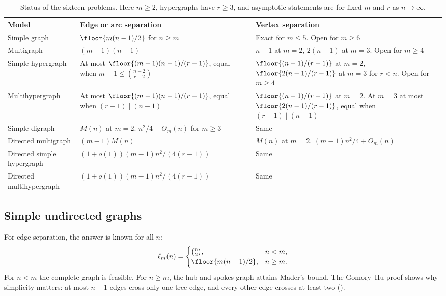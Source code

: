 \begin{table}[htbp]
\centering\small
\renewcommand{\arraystretch}{1.2}
\begin{tabularx}{\textwidth}{@{}>{\raggedright\arraybackslash}p{}>{\raggedright\arraybackslash}X>{\raggedright\arraybackslash}X@{}}
\toprule
Model & Edge or arc separation & Vertex separation \\
\midrule
Simple graph & $\floor{m(n-1)/2}$ for $n\ge m$ & Exact for $m\le5$. Open for $m\ge6$ \\
Multigraph & $(m-1)(n-1)$ & $n-1$ at $m=2$, $2(n-1)$ at $m=3$. Open for $m\ge4$ \\
Simple hypergraph & At most $\floor{(m-1)(n-1)/(r-1)}$, equal when $m-1\le\binom{n-2}{r-2}$ & $\floor{(n-1)/(r-1)}$ at $m=2$, $\floor{2(n-1)/(r-1)}$ at $m=3$ for $r<n$. Open for $m\ge4$ \\
Multihypergraph & At most $\floor{(m-1)(n-1)/(r-1)}$, equal when $(r-1)\mid(n-1)$ & $\floor{(n-1)/(r-1)}$ at $m=2$. At $m=3$ at most $\floor{2(n-1)/(r-1)}$, equal when $(r-1)\mid(n-1)$ \\
Simple digraph & $M(n)$ at $m=2$. $n^2/4+\Theta_m(n)$ for $m\ge3$ & Same \\
Directed multigraph & $(m-1)M(n)$ & $M(n)$ at $m=2$. $(m-1)n^2/4+O_m(n)$ \\
Directed simple hypergraph & $(1+o(1))(m-1)n^2/(4(r-1))$ & Same \\
Directed multihypergraph & $(1+o(1))(m-1)n^2/(4(r-1))$ & Same \\
\bottomrule
\end{tabularx}
\caption{Status of the sixteen problems. Here $m\ge2$, hypergraphs have $r\ge3$, and asymptotic statements are for fixed $m$ and $r$ as $n\to\infty$.}
\label{tab:summary}
\end{table}

\subsection{Simple undirected graphs}
\label{sec:status-simple-undirected}

For edge separation, the answer is known for all $n$:
\[
 \ell_m(n)=
 \begin{cases}
 \binom n2,&n<m,\\
 \floor{m(n-1)/2},&n\ge m.
 \end{cases}
\]
For $n<m$ the complete graph is feasible. For $n\ge m$, the hub-and-spokes graph attains Mader's bound.
The Gomory--Hu proof shows why simplicity matters: at most $n-1$ edges cross only one tree edge, and every other edge crosses at least two ().

